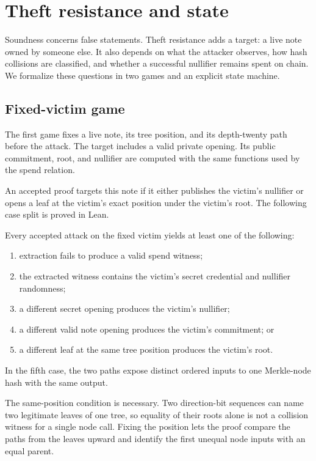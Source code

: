 \section{Theft resistance and state}
\label{sec:theft-state}

Soundness concerns false statements.  Theft resistance adds a target: a live
note owned by someone else.  It also depends on what the attacker observes,
how hash collisions are classified, and whether a successful nullifier remains
spent on chain.  We formalize these questions in two games and an explicit
state machine.

\subsection{Fixed-victim game}

The first game fixes a live note, its tree position, and its depth-twenty path
before the attack.  The target includes a valid private opening.  Its public
commitment, root, and nullifier are computed with the same functions used by
the spend relation.

An accepted proof targets this note if it either publishes the victim's
nullifier or opens a leaf at the victim's exact position under the victim's
root.  The following case split is proved in Lean.

\begin{theorem}
\label{thm:fixed-victim}
Every accepted attack on the fixed victim yields at least one of the following:
\begin{enumerate}[leftmargin=*]
  \item extraction fails to produce a valid spend witness;
  \item the extracted witness contains the victim's secret credential and
        nullifier randomness;
  \item a different secret opening produces the victim's nullifier;
  \item a different valid note opening produces the victim's commitment; or
  \item a different leaf at the same tree position produces the victim's
        root.
\end{enumerate}
In the fifth case, the two paths expose distinct ordered inputs to one
Merkle-node hash with the same output.
\end{theorem}

The same-position condition is necessary.  Two direction-bit sequences can
name two legitimate leaves of one tree, so equality of their roots alone is
not a collision witness for a single node call.  Fixing the position lets the
proof compare the paths from the leaves upward and identify the first unequal
node inputs with an equal parent.

